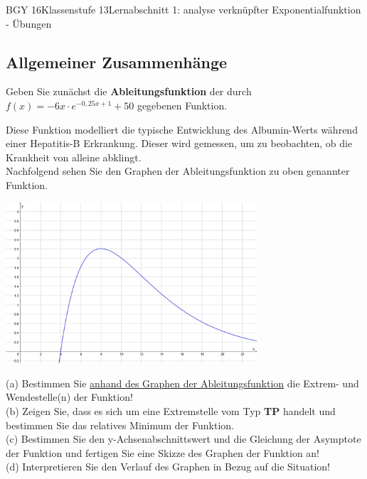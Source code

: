 \documentclass[oneside,openany,headings=optiontotoc,11pt,numbers=noenddot]{scrreprt}
\begin{document}
\begin{worksheet}{BGY 16}{Klassenstufe 13}{Lernabschnitt 1: analyse verknüpfter Exponentialfunktion - Übungen}
\begin{framed}
			\subsection{Allgemeiner Zusammenhänge}
			Geben Sie zunächst die \textbf{Ableitungsfunktion} der durch \(f(x) = -6x\cdot{}e^{-0,25x+1}+50\) gegebenen Funktion.\\
			\par\noindent
			Diese Funktion modelliert die typische Entwicklung des \glqq{}Albumin\grqq{}-Werts während einer Hepatitis-B Erkrankung. Dieser wird gemessen, um zu beobachten, ob die Krankheit von alleine abklingt.\\
			Nachfolgend sehen Sie den Graphen der Ableitungsfunktion zu oben genannter Funktion.\\
			\begin{center}
				\includegraphics[width=0.7\textwidth]{../99_Bilder/01_ExpFkt/allgZsmhg.jpg}\\
			\end{center}
			\par\noindent
			(a) Bestimmen Sie \underline{anhand des Graphen der Ableitungsfunktion} die Extrem- und Wendestelle(n) der Funktion!\\
			(b) Zeigen Sie, dass es sich um eine Extremstelle vom Typ \textbf{TP} handelt und bestimmen Sie das relatives Minimum der Funktion.\\
			(c) Bestimmen Sie den y-Achsenabschnittswert und die Gleichung der Asymptote der Funktion und fertigen Sie eine Skizze des Graphen der Funktion an!\\
			(d) Interpretieren Sie den Verlauf des Graphen in Bezug auf die Situation!
		\end{framed}
		\begin{framed}
			\noindent

\end{framed}
\end{worksheet}
\end{document}
